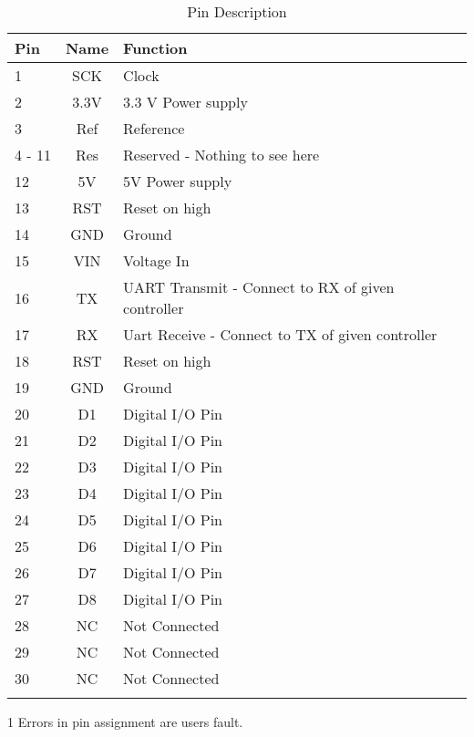 \documentclass[10pt]{datasheet}
\begin{document}
\begin{table}[h]
\begin{threeparttable}
\caption{Pin Description}
\begin{tabularx}{\textwidth}{l | c | X}
    \thickhline
    \textbf{Pin} & \textbf{Name} & \textbf{Function}\\
    \hline
    1  		& SCK 	& Clock \\
    \hline
    2 		& 3.3V 	& 3.3 V Power supply  \\
    \hline
    3		& Ref	& Reference \\
    \hline
    4 - 11 	& Res	& Reserved - Nothing to see here \\
    \hline
    12  	& 5V  	& 5V Power supply \\
    \hline
    13  	& RST 	& Reset on high \\
    \hline
    14  	& GND 	& Ground \\
    \hline
    15  	& VIN 	& Voltage In \\
    \hline
    16  	& TX  	& UART Transmit - Connect to RX of given controller \\
    \hline
    17  	& RX  	& Uart Receive - Connect to TX of given controller \\
    \hline
    18  	& RST 	& Reset on high \\
    \hline
    19  	& GND 	& Ground \\
    \hline
    20  	& D1  	& Digital I/O Pin \\
    \hline
    21  	& D2  	& Digital I/O Pin \\
    \hline
    22  	& D3  	& Digital I/O Pin \\
    \hline
    23  	& D4  	& Digital I/O Pin \\
    \hline
    24  	& D5  	& Digital I/O Pin \\
    \hline
    25  	& D6  	& Digital I/O Pin \\
    \hline
    26  	& D7  	& Digital I/O Pin \\
    \hline
    27  	& D8  	& Digital I/O Pin \\
    \hline
    28  	& NC  	& Not Connected \\
    \hline
    29  	& NC  	& Not Connected \\
    \hline
    30  	& NC  	& Not Connected \\
    \thickhline
\end{tabularx}
\begin{tablenotes}
\item[1]{Errors in pin assignment are users fault.}
\end{tablenotes}
\end{threeparttable}
\end{table}
\end{document}
